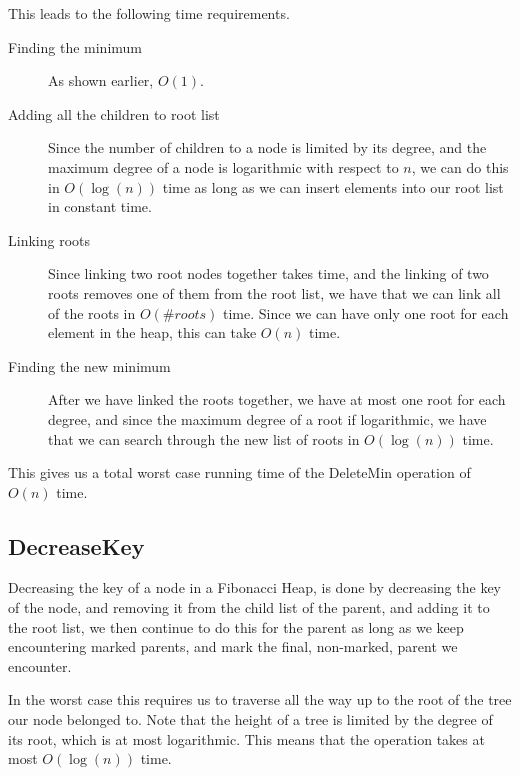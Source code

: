 This leads to the following time requirements. 

\begin{description}
\item[Finding the minimum] As shown earlier, $O(1)$.
\item[Adding all the children to root list] Since the number of children to a node is limited by its degree, and the maximum degree of a node is logarithmic with respect to $n$, we can do this in $O(\log (n))$ time as long as we can insert elements into our root list in constant time.
\item[Linking roots] Since linking two root nodes together takes time, and the linking of two roots removes one of them from the root list, we have that we can link all of the roots in $O(\#roots)$ time. Since we can have only one root for each element in the heap, this can take $O(n)$ time.
\item[Finding the new minimum] After we have linked the roots together, we have at most one root for each degree, and since the maximum degree of a root if logarithmic, we have that we can search through the new list of roots in $O(\log (n))$ time.
\end{description}

This gives us a total worst case running time of the DeleteMin operation of $O(n)$ time.

\subsection{DecreaseKey}

Decreasing the key of a node in a Fibonacci Heap, is done by decreasing the key of the node, and removing it from the child list of the parent, and adding it to the root list, we then continue to do this for the parent as long as we keep encountering marked parents, and mark the final, non-marked, parent we encounter.

In the worst case this requires us to traverse all the way up to the root of the tree our node belonged to. Note that the height of a tree is limited by the degree of its root, which is at most logarithmic. This means that the operation takes at most $O(\log (n))$ time.